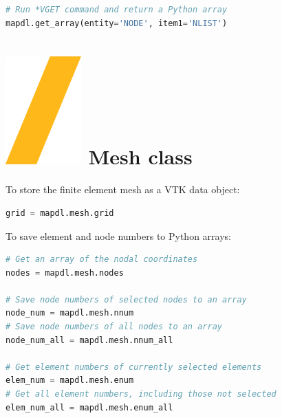 \documentclass[9pt,landscape]{article}
\begin{document}
\begin{multicols}{3}
\begin{lstlisting}[language=Python]
# Run *VGET command and return a Python array
mapdl.get_array(entity='NODE', item1='NLIST')
\end{lstlisting} 

\section{\includegraphics[height=\fontcharht\font`\S]{slash.png} Mesh class}
To store the finite element mesh as a VTK  data object:
\begin{lstlisting}[language=Python]
grid = mapdl.mesh.grid
\end{lstlisting} 

To save element and node numbers to Python arrays:
\begin{lstlisting}[language=Python]
# Get an array of the nodal coordinates
nodes = mapdl.mesh.nodes

# Save node numbers of selected nodes to an array
node_num = mapdl.mesh.nnum
# Save node numbers of all nodes to an array
node_num_all = mapdl.mesh.nnum_all

# Get element numbers of currently selected elements
elem_num = mapdl.mesh.enum
# Get all element numbers, including those not selected
elem_num_all = mapdl.mesh.enum_all
\end{lstlisting} 
\vfill

\columnbreak


\end{multicols}
\end{document}

